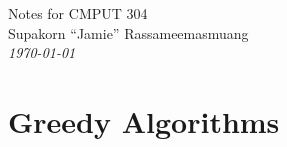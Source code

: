 \documentclass{report}
\begin{document}
\begin{titlepage}
    \centering
    \vspace*{5cm}
    {
    \Large
    Notes for CMPUT 304\\
    }
    {
    \vspace{3cm}
    Supakorn ``Jamie'' Rassameemasmuang \\
    \vspace{0.5cm}
    \textit{\today}
    }
\end{titlepage}

\tableofcontents

    \chapter{Greedy Algorithms}
    
\end{document}
